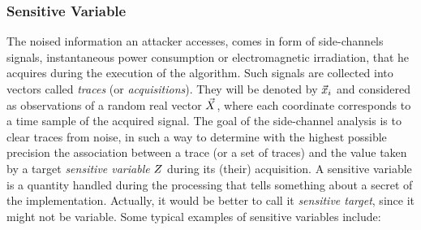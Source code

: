 \subsubsection{Sensitive Variable}\label{sec:sensVar}
The noised information an attacker accesses, comes in form of side-channels signals, \eg instantaneous power consumption or electromagnetic irradiation, that he acquires during the execution of the algorithm. Such signals are collected into vectors called \emph{traces} (or \emph{acquisitions}). They will be denoted by $\vec{x}_i$ and considered as observations of a random real vector $\vec{X}$, where each coordinate corresponds to a time sample of the acquired signal. The goal of the side-channel analysis is to clear traces from noise, in such a way to determine with the highest possible precision the association between a trace (or a set of traces) and the value taken by a target \emph{sensitive variable} $Z$ during its (their) acquisition. A sensitive variable is a quantity handled during the processing that tells something about a secret of the implementation. Actually, it would be better to call it \emph{sensitive target}, since it might not be variable. Some typical examples of sensitive variables include: 



